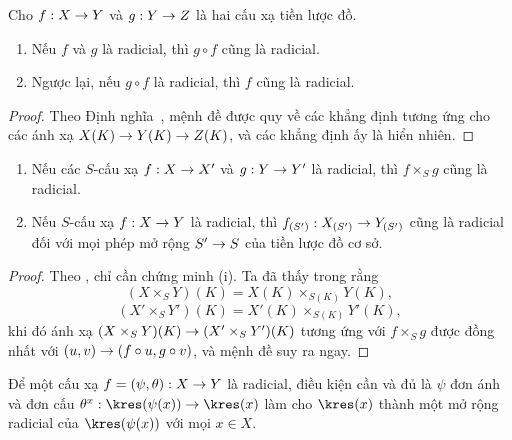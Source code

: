 \documentclass[oneside]{amsart}
\makeatletter
\newcommand{\ega@arrow}[2]{\mathchoice{#1}{#2}{#2}{#2}}
\renewcommand{\to}{\ega@arrow{\longrightarrow}{\rightarrow}}
\let\EGAOriginalLabel\label
\renewcommand{\label}[1]{\phantomsection\EGAOriginalLabel{#1}}
\makeatother
\begin{document}
\begin{proposition}[3.5.6]
\label{I.3.5.6}
Cho $f:X\to Y$ và $g:Y\to Z$ là hai cấu xạ tiền lược đồ.
\begin{enumerate}
  \item[{\rm(i)}] Nếu $f$ và $g$ là radicial, thì $g\circ f$ cũng là
  radicial.
  \item[{\rm(ii)}] Ngược lại, nếu $g\circ f$ là radicial, thì $f$ cũng là
  radicial.
\end{enumerate}
\end{proposition}

\begin{proof}
Theo Định nghĩa~, mệnh đề được quy về các khẳng định tương ứng
cho các ánh xạ $X(K)\to Y(K)\to Z(K)$, và các khẳng định ấy là hiển nhiên.
\end{proof}

\begin{proposition}[3.5.7]
\label{I.3.5.7}
\medskip\noindent
\begin{enumerate}
  \item[{\rm(i)}] Nếu các $S$-cấu xạ $f:X\to X'$ và $g:Y\to Y'$ là
  radicial, thì $f\times_S g$ cũng là radicial.
  \item[{\rm(ii)}] Nếu $S$-cấu xạ $f:X\to Y$ là radicial, thì
  $f_{(S')}:X_{(S')}\to Y_{(S')}$ cũng là radicial đối với mọi phép mở rộng
  $S'\to S$ của tiền lược đồ cơ sở.
\end{enumerate}
\end{proposition}

\begin{proof}
Theo , chỉ cần chứng minh (i).
Ta đã thấy trong  rằng
\[
  (X\times_S Y)(K)=X(K)\times_{S(K)}Y(K),
\]
\[
  (X'\times_S Y')(K)=X'(K)\times_{S(K)}Y'(K),
\]
khi đó ánh xạ $(X\times_S Y)(K)\to(X'\times_S Y')(K)$ tương ứng với
$f\times_S g$ được đồng nhất với $(u,v)\to(f\circ u,g\circ v)$, và mệnh đề
suy ra ngay.
\end{proof}

\begin{proposition}[3.5.8]
\label{I.3.5.8}
Để một cấu xạ $f=(\psi,\theta):X\to Y$ là radicial, điều kiện cần và đủ là
$\psi$ đơn ánh và đơn cấu $\theta^x:\kres(\psi(x))\to\kres(x)$ làm cho
$\kres(x)$ thành một mở rộng radicial của $\kres(\psi(x))$ với mọi
$x\in X$.
\end{proposition}
\end{document}
